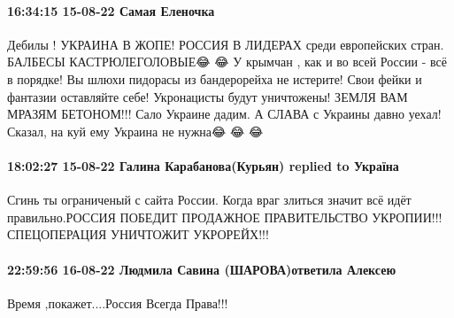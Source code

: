  
 
 
 
 

\paragraph{16:34:15 15-08-22 Самая Еленочка}

Дебилы ! УКРАИНА В ЖОПЕ! РОССИЯ В ЛИДЕРАХ среди европейских стран. БАЛБЕСЫ
КАСТРЮЛЕГОЛОВЫЕ😂 😂 У крымчан , как и во всей России - всё в порядке! Вы шлюхи
пидорасы из бандерорейха не истерите! Свои фейки и фантазии оставляйте себе!
Укронацисты будут уничтожены! ЗЕМЛЯ ВАМ МРАЗЯМ БЕТОНОМ!!! Сало Украине дадим. А
СЛАВА с Украины давно уехал! Сказал, на куй ему Украина не нужна😂 😂 😂

\paragraph{18:02:27 15-08-22 Галина Карабанова(Курьян) replied to Україна}

Сгинь ты ограниченый с сайта России. Когда враг злиться значит всё идёт
правильно.РОССИЯ ПОБЕДИТ ПРОДАЖНОЕ ПРАВИТЕЛЬСТВО УКРОПИИ!!! СПЕЦОПЕРАЦИЯ
УНИЧТОЖИТ УКРОРЕЙХ!!!

\paragraph{22:59:56 16-08-22 Людмила Савина (ШАРОВА)ответила Алексею}

Время ,покажет....Россия Всегда Права!!!
